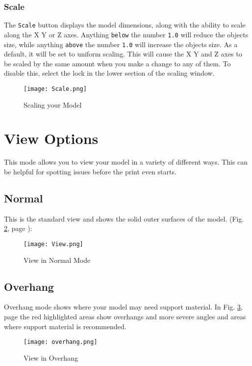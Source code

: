 \subsubsection{Scale}
The \texttt{Scale} button displays the model dimensions, along with the ability to scale along the X Y or Z axes. Anything \texttt{below} the number \texttt{1.0} will reduce the objects size, while anything \texttt{above} the number \texttt{1.0} will increase the objects size. As a default, it will be set to uniform scaling. This will cause the X Y and Z axes to be scaled by the same amount when you make a change to any of them. To disable this, select the lock in the lower section of the scaling window. 
\begin{figure}[H]
\centering
\texttt{[image: Scale.png]}
\caption{Scaling your Model}
\label{fig:Scaling your Model}
\end{figure}

\section{View Options}
This mode allows you to view your model in a variety of different ways. This can be helpful for spotting issues before the print even starts. 

\subsection{Normal}
This is the standard view and shows the solid outer surfaces of the model. (Fig. \ref{fig:Normal View}, page \pageref{fig:Normal View}): 

\begin{figure}[H]
\centering
\texttt{[image: View.png]}
\caption{View in Normal Mode}
\label{fig:Normal View}
\end{figure}

\subsection{Overhang}
Overhang mode shows where your model may need support material. In Fig. \ref{fig:Overhang_View}, page \pageref{fig:Overhang_View} the red highlighted areas show overhangs and more severe angles and areas where support material is recommended.
\begin{figure}[H]
\centering
\texttt{[image: overhang.png]}
\caption{View in Overhang}
\label{fig:Overhang_View}
\end{figure}

